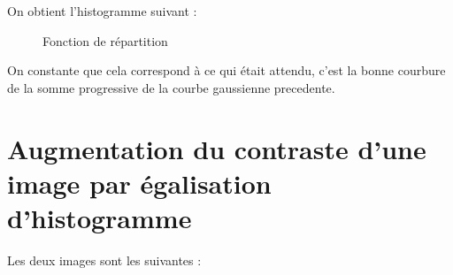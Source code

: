 \documentclass[french,a4paper,10pt]{article}
\begin{document}
    On obtient l'histogramme suivant :
    \begin{figure}[!htb]
        \begin{minipage}{0.48\textwidth}
            \centering
            \caption{Fonction de répartition}\label{Fig:orig-peppers-3}
        \end{minipage}\hfill
    \end{figure}

    On constante que cela correspond à ce qui était attendu, c'est la bonne
    courbure de la somme progressive de la courbe gaussienne precedente.

    \newpage

    \section{Augmentation du contraste d'une image par égalisation d'histogramme}\label{sec:4}

    Les deux images sont les suivantes :
\end{document}

